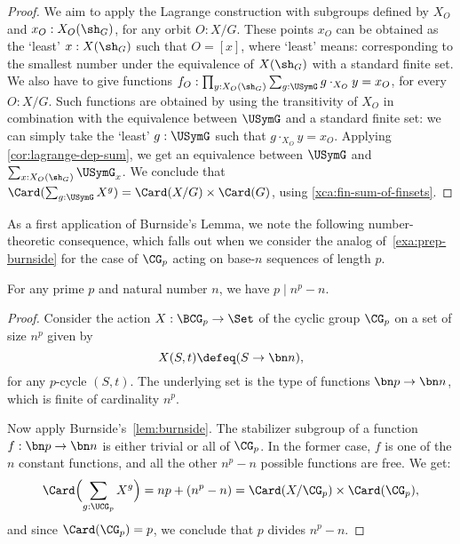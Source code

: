 \begin{proof}
  We aim to apply the Lagrange construction with subgroups 
  defined by $X_O$ and
  $x_O : X_O(\sh_G)$, for any orbit $O:X/G$. These points $x_O$ can
  be obtained as the `least' $x:X(\sh_G)$ such that $O=[x]$,
  where `least' means: corresponding to the smallest number under the
  equivalence of $X(\sh_G)$ with a standard finite set.
  We also have to give functions
  $f_O : \prod_{y:X_O(\sh_G)}\sum_{g:\USymG} g\cdot_{X_O} y = x_O$,
  for every $O:X/G$.
  Such functions are obtained by using the transitivity of $X_O$
  in combination with the equivalence between $\USymG$ and a 
  standard finite set: we can simply take the `least' $g:\USymG$
  such that $g\cdot_{X_O} y = x_O$.
  Applying \cref{cor:lagrange-dep-sum},
  we get an equivalence between $\USymG$ and $\sum_{x : X_O(\sh_G)} \USymG_x$. 
  We conclude that $\Card(\sum_{g:\USymG} X^g) = \Card(X/G) \times \Card(G)$,
  using \cref{xca:fin-sum-of-finsets}.
\end{proof}

As a first application of Burnside's Lemma, we note the following
number-theoretic consequence, which falls out when we consider
the analog of~\cref{exa:prep-burnside} for the case of $\CG_p$ acting
on base-$n$ sequences of length $p$.

\begin{theorem}
  For any prime $p$ and natural number $n$, we have $p \mid {n^p-n}$.
\end{theorem}
\begin{proof}
  Consider the action $X : \BCG_p \to \Set$ of the cyclic group $\CG_p$ on
  a set of size $n^p$ given by
  \[
    X(S,t) \defeq (S \to \bn n),
  \]
  for any $p$-cycle $(S,t)$. The underlying set is the type of functions
  $\bn p \to \bn n$, which is finite of cardinality $n^p$.

  Now apply Burnside's~\cref{lem:burnside}. The stabilizer subgroup
  of a function $f : \bn p \to \bn n$ is either trivial or all of $\CG_p$.
  In the former case, $f$ is one of the $n$ constant functions,
  and all the other $n^p-n$ possible functions are free.
  We get:
  \[
    \Card\Bigl(\sum_{g:\UCG_p} X^g\Bigr)
    = np + (n^p-n) = \Card(X/\CG_p) \times \Card(\CG_p),
  \]
  and since $\Card(\CG_p)=p$, we conclude that $p$ divides $n^p-n$.
\end{proof}




